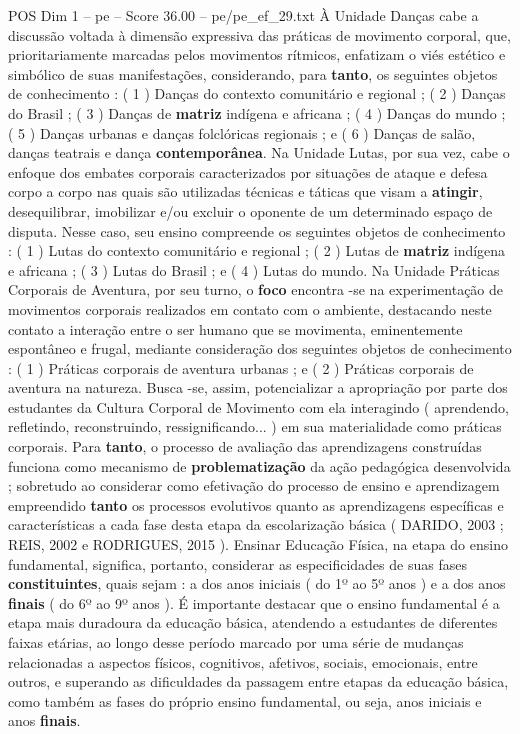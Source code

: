 \begin{textsample}{POS Dim 1 – pe – Score 36.00 – pe/pe\_ef\_29.txt}
À Unidade Danças cabe a discussão voltada à dimensão expressiva das práticas de movimento corporal, que, prioritariamente marcadas pelos movimentos rítmicos, enfatizam o viés estético e simbólico de suas manifestações, considerando, para \textbf{tanto}, os seguintes objetos de conhecimento : ( 1 ) Danças do contexto comunitário e regional ; ( 2 ) Danças do Brasil ; ( 3 ) Danças de \textbf{matriz} indígena e africana ; ( 4 ) Danças do mundo ; ( 5 ) Danças urbanas e danças folclóricas regionais ; e ( 6 ) Danças de salão, danças teatrais e dança \textbf{contemporânea}.
Na Unidade Lutas, por sua vez, cabe o enfoque dos embates corporais caracterizados por situações de ataque e defesa corpo a corpo nas quais são utilizadas técnicas e táticas que visam a \textbf{atingir}, desequilibrar, imobilizar e/ou excluir o oponente de um determinado espaço de disputa.
Nesse caso, seu ensino compreende os seguintes objetos de conhecimento : ( 1 ) Lutas do contexto comunitário e regional ; ( 2 ) Lutas de \textbf{matriz} indígena e africana ; ( 3 ) Lutas do Brasil ; e ( 4 ) Lutas do mundo.
Na Unidade Práticas Corporais de Aventura, por seu turno, o \textbf{foco} encontra -se na experimentação de movimentos corporais realizados em contato com o ambiente, destacando neste contato a interação entre o ser humano que se movimenta, eminentemente espontâneo e frugal, mediante consideração dos seguintes objetos de conhecimento : ( 1 ) Práticas corporais de aventura urbanas ; e ( 2 ) Práticas corporais de aventura na natureza.
Busca -se, assim, potencializar a apropriação por parte dos estudantes da Cultura Corporal de Movimento com ela interagindo ( aprendendo, refletindo, reconstruindo, ressignificando... ) em sua materialidade como práticas corporais.
Para \textbf{tanto}, o processo de avaliação das aprendizagens construídas funciona como mecanismo de \textbf{problematização} da ação pedagógica desenvolvida ; sobretudo ao considerar como efetivação do processo de ensino e aprendizagem empreendido \textbf{tanto} os processos evolutivos quanto as aprendizagens específicas e características a cada fase desta etapa da escolarização básica ( DARIDO, 2003 ; REIS, 2002 e RODRIGUES, 2015 ).
Ensinar Educação Física, na etapa do ensino fundamental, significa, portanto, considerar as especificidades de suas fases \textbf{constituintes}, quais sejam : a dos anos iniciais ( do 1º ao 5º anos ) e a dos anos \textbf{finais} ( do 6º ao 9º anos ).
É importante destacar que o ensino fundamental é a etapa mais duradoura da educação básica, atendendo a estudantes de diferentes faixas etárias, ao longo desse período marcado por uma série de mudanças relacionadas a aspectos físicos, cognitivos, afetivos, sociais, emocionais, entre outros, e superando as dificuldades da passagem entre etapas da educação básica, como também as fases do próprio ensino fundamental, ou seja, anos iniciais e anos \textbf{finais}.


\end{textsample}
